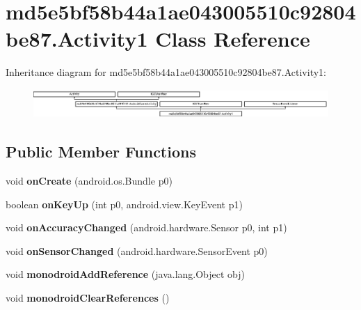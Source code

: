 \hypertarget{classmd5e5bf58b44a1ae043005510c92804be87_1_1Activity1}{}\section{md5e5bf58b44a1ae043005510c92804be87.\+Activity1 Class Reference}
\label{classmd5e5bf58b44a1ae043005510c92804be87_1_1Activity1}
Inheritance diagram for md5e5bf58b44a1ae043005510c92804be87.\+Activity1\+:\begin{figure}[H]
\begin{center}
\leavevmode
\includegraphics[height=1.093750cm]{classmd5e5bf58b44a1ae043005510c92804be87_1_1Activity1}
\end{center}
\end{figure}
\subsection*{Public Member Functions}
\begin{DoxyCompactItemize}
\item 
\mbox{\label{classmd5e5bf58b44a1ae043005510c92804be87_1_1Activity1_abdc63f59af817f918ec6394882e95cac}} 
void {\bfseries on\+Create} (android.\+os.\+Bundle p0)
\item 
\mbox{\label{classmd5e5bf58b44a1ae043005510c92804be87_1_1Activity1_a95b10e1c5352bc9978db83a28d06fe8a}} 
boolean {\bfseries on\+Key\+Up} (int p0, android.\+view.\+Key\+Event p1)
\item 
\mbox{\label{classmd5e5bf58b44a1ae043005510c92804be87_1_1Activity1_a82a22c526bc4d417adfd92d879f62849}} 
void {\bfseries on\+Accuracy\+Changed} (android.\+hardware.\+Sensor p0, int p1)
\item 
\mbox{\label{classmd5e5bf58b44a1ae043005510c92804be87_1_1Activity1_ac6874c4ab9fb2bddb24884f48d28487f}} 
void {\bfseries on\+Sensor\+Changed} (android.\+hardware.\+Sensor\+Event p0)
\item 
\mbox{\label{classmd5e5bf58b44a1ae043005510c92804be87_1_1Activity1_a652f384e9791091b52295bdcd524c328}} 
void {\bfseries monodroid\+Add\+Reference} (java.\+lang.\+Object obj)
\item 
\mbox{\label{classmd5e5bf58b44a1ae043005510c92804be87_1_1Activity1_a3d0276aff5e22171d0c9596b7015ba34}} 
void {\bfseries monodroid\+Clear\+References} ()
\end{DoxyCompactItemize}

